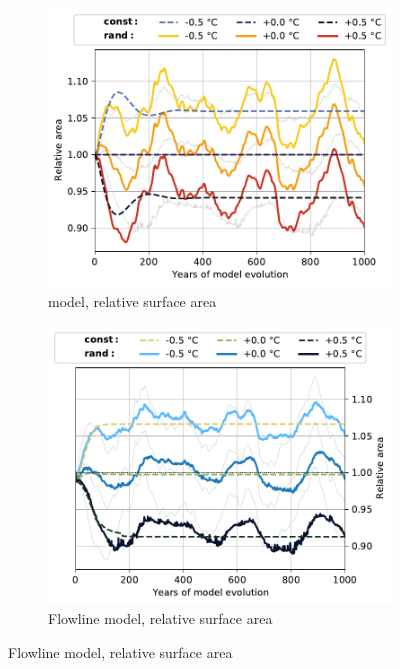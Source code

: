 \begin{figure}[p]
  \begin{subfigure}[b]{0.476\textwidth}
    \caption{\Vas{} model, relative surface area}
    \label{fig:Mer_de_Glace:area_vas}
    \centering
    \includegraphics[width=\textwidth]{../plots/final_plots/time_series/single_glaciers/area_norm_vas_Mer_de_Glace.pdf}
  \end{subfigure}
  \hfill
  \begin{subfigure}[b]{0.476\textwidth}
    \caption{Flowline model, relative surface area}
    \label{fig:Mer_de_Glace:area_fl}
    \centering
    \includegraphics[width=\textwidth]{../plots/final_plots/time_series/single_glaciers/area_norm_fl_Mer_de_Glace.pdf}
  \end{subfigure}


\end{figure}
